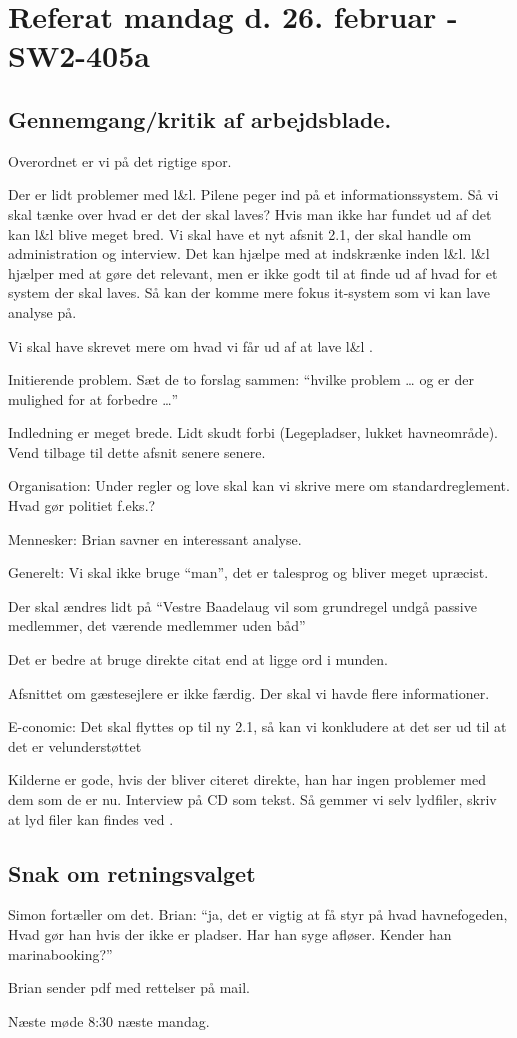 \documentclass{article}
\begin{document}
\section{Referat mandag d. 26. februar - SW2-405a}
\subsection{Gennemgang/kritik af arbejdsblade.}

Overordnet er vi på det rigtige spor.

Der er lidt problemer med l\&l. Pilene peger ind på et informationssystem. Så vi skal tænke over hvad er det der skal laves? Hvis man ikke har fundet ud af det kan l\&l blive meget bred. Vi skal have et nyt afsnit 2.1, der skal handle om administration og interview. Det kan hjælpe med at indskrænke inden l\&l. l\&l hjælper med at gøre det relevant, men er ikke godt til at finde ud af hvad for et system der skal laves. Så kan der komme mere fokus it-system som vi kan lave analyse på.

Vi skal have skrevet mere om hvad vi får ud af at lave l\&l .

Initierende problem. Sæt de to forslag sammen: “hvilke problem … og er der mulighed for at forbedre …”

Indledning er meget brede. Lidt skudt forbi (Legepladser, lukket havneområde). Vend tilbage til dette afsnit senere senere.

Organisation: Under regler og love skal kan vi skrive mere om standardreglement. Hvad gør politiet f.eks.?

Mennesker: Brian savner en interessant analyse.

Generelt: Vi skal ikke bruge “man”, det er talesprog og bliver meget upræcist.

Der skal ændres lidt på “Vestre Baadelaug vil som grundregel undgå passive medlemmer, det værende medlemmer uden båd”

Det er bedre at bruge direkte citat end at ligge ord i munden.

Afsnittet om gæstesejlere er ikke færdig. Der skal vi havde flere informationer.

E-conomic: Det skal flyttes op til ny 2.1, så kan vi konkludere at det ser ud til at det er velunderstøttet

Kilderne er gode, hvis der bliver citeret direkte, han har ingen problemer med dem som de er nu. Interview på CD som tekst. Så gemmer vi selv lydfiler, skriv at lyd filer kan findes ved .

\subsection{Snak om retningsvalget}

Simon fortæller om det. Brian: “ja, det er vigtig at få styr på hvad havnefogeden, Hvad gør han hvis der ikke er pladser. Har han syge afløser. Kender han marinabooking?”

Brian sender pdf med rettelser på mail.

Næste møde 8:30 næste mandag.
\end{document}
